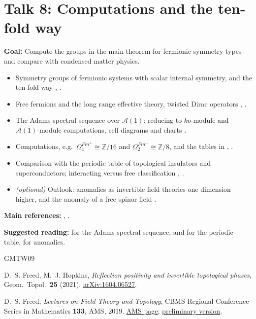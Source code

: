 \documentclass[11pt,a4paper]{article}
\newcommand{\talk}[2]{\section*{Talk #1: #2}}
\newcommand{\refs}[1]{\par\smallskip\textbf{Main references:} #1}
\newcommand{\suggested}[1]{\par\textbf{Suggested reading:} #1}
\begin{document}
\talk{8}{Computations and the ten-fold way}

\textbf{Goal:} Compute the groups in the main theorem for fermionic symmetry types and compare with condensed matter physics.

\begin{itemize}
  \item Symmetry groups of fermionic systems with scalar internal symmetry, and the ten-fold way \cite[\S9.1]{FH}, \cite[L10.1]{F}.
  \item Free fermions and the long range effective theory, twisted Dirac operators \cite[\S9.2]{FH}, \cite[L10.2]{F}.
  \item The Adams spectral sequence over $\mathcal{A}(1)$: reducing to $ko$-module and $\mathcal{A}(1)$-module computations, cell diagrams and charts \cite[Appendix~D]{FH}.
  \item Computations, e.g.\ $\Omega^{Pin^+}_4 \cong \mathbb{Z}/16$ and $\Omega^{Pin^-}_2 \cong \mathbb{Z}/8$, and the tables in \cite[\S10]{FH}, \cite[L10.3]{F}.
  \item Comparison with the periodic table of topological insulators and superconductors; interacting versus free classification \cite[\S9.3]{FH}, \cite[L10.4]{F}.
  \item \emph{(optional)} Outlook: anomalies as invertible field theories one dimension higher, and the anomaly of a free spinor field \cite[L11]{F}.
\end{itemize}
\refs{\cite[L10, L11]{F}, \cite[\S\S9--10, Appendix~D]{FH}.}
\suggested{\cite{BC} for the Adams spectral sequence, \cite{K} and \cite{FM} for the periodic table, \cite{FAn} for anomalies.}

\renewcommand{\refname}{Main references}
\begin{thebibliography}{GMTW09}

D.~S. Freed, M.~J. Hopkins,
\emph{Reflection positivity and invertible topological phases},
Geom.\ Topol.\ \textbf{25} (2021).
\href{https://arxiv.org/abs/1604.06527}{arXiv:1604.06527}.

D.~S. Freed,
\emph{Lectures on Field Theory and Topology},
CBMS Regional Conference Series in Mathematics \textbf{133}, AMS, 2019.
\href{https://www.ams.org/books/cbms/133}{AMS page};
\href{https://web.ma.utexas.edu/users/dafr/CBMS133.pdf}{preliminary version}.

\end{thebibliography}
\end{document}
